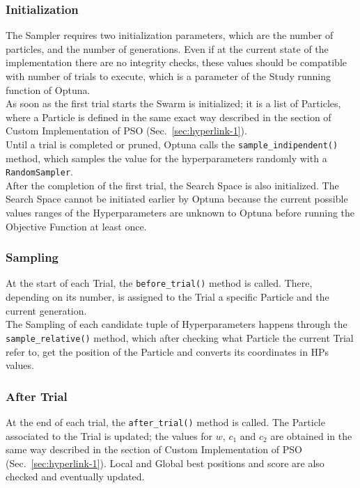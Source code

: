 \subsubsection{Initialization}
The Sampler requires two initialization parameters, which are the number of particles, and the number of generations. 
Even if at the current state of the implementation there are no integrity checks, these values should be compatible with number of trials to execute, which is a parameter of the Study running function of Optuna. 
\\[0.3cm]As soon as the first trial starts the Swarm is initialized; it is a list of Particles, where a Particle is defined in the same exact way described in the section of Custom Implementation of PSO (Sec.~\ref{sec:hyperlink-1}).
\\[0.3cm]Until a trial is completed or pruned, Optuna calls the \texttt{sample\_indipendent()} method, which samples the value for the hyperparameters randomly with a \texttt{RandomSampler}.
\\[0.3cm]After the completion of the first trial, the Search Space is also initialized. The Search Space cannot be initiated earlier by Optuna because the current possible values ranges of the Hyperparameters are unknown to Optuna before running the Objective Function at least once.

\subsubsection{Sampling}

At the start of each Trial, the \texttt{before\_trial()} method is called. There, depending on its number, is assigned to the Trial a specific Particle and the current generation.
\\[0.3cm]The Sampling of each candidate tuple of Hyperparameters happens through the \newline\texttt{sample\_relative()} method, which after checking what Particle the current Trial refer to, get the position of the Particle and converts its coordinates in HPs values.

\subsubsection{After Trial}

At the end of each trial, the \texttt{after\_trial()} method is called.
The Particle associated to the Trial is updated; the values for $w$, $c_1$ and $c_2$ are obtained in the same way described in the section of Custom Implementation of PSO (Sec.~\ref{sec:hyperlink-1}).
Local and Global best positions and score are also checked and eventually updated.

